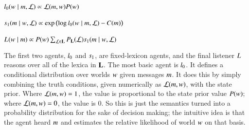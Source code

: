 \documentclass[leqno,12pt]{article}
\begin{document}
\begin{examples}
\item\label{agents}
  \begin{examples}

  \item\label{l0}%
    $l_{0}(w \mid m, \mathcal{L}) \propto \mathcal{L}(m, w)P(w)$



  \item\label{s1}%
    $s_{1}(m \mid w, \mathcal{L}) \propto
    \exp
    \left(
      \log l_{0}(w \mid m, \mathcal{L})
      - 
      C(m)
    \right)$
    
  \item\label{L} 
    $L_{}(w \mid m) 
    \propto 
    P(w)
    \sum_{\mathcal{L} \in \mathbf{L}}
    P_{\mathbf{L}}(\mathcal{L})
    s_{1}(m \mid w, \mathcal{L})$
  \end{examples}
\end{examples}

The first two agents, $l_{0}$ and $s_{1}$, are
fixed-lexicon agents, and the final listener $L_{}$
reasons over all of the lexica in $\mathbf{L}$.  The most basic agent is
$l_{0}$. It defines a conditional distribution over worlds
$w$ given messages $m$. It does this by simply combining the
truth conditions, given numerically as $\mathcal{L}(m, w)$, with the
state prior. Where $\mathcal{L}(m, w)=1$, the value is proportional
to the state prior value $P(w)$; where
$\mathcal{L}(m, w)=0$, the value is $0$. So this is just the
semantics turned into a probability distribution for the sake of
decision making; the intuitive idea is that the agent heard $m$ and
estimates the relative likelihood of world $w$ on that basis.
\end{document}
